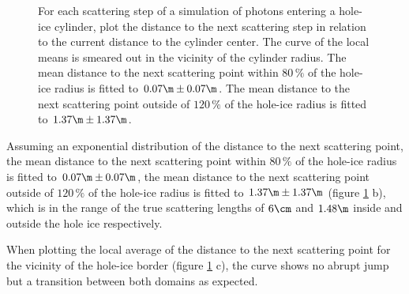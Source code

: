 \begin{figure}[htbp]
  \hfill
  \hfill
  \caption{For each scattering step of a simulation of photons entering a hole-ice cylinder, plot the distance to the next scattering step in relation to the current distance to the cylinder center. The curve of the local means is smeared out in the vicinity of the cylinder radius. The mean distance to the next scattering point within $80\,\%$ of the hole-ice radius is fitted to $0.07\m \pm 0.07\m$. The mean distance to the next scattering point outside of $120\,\%$ of the hole-ice radius is fitted to $1.37\m\pm 1.37\m$. }
  \label{fig:eeYoid2p}
\end{figure}

Assuming an exponential distribution of the distance to the next scattering point, the mean distance to the next scattering point within $80\,\%$ of the hole-ice radius is fitted to $0.07\m \pm 0.07\m$, the mean distance to the next scattering point outside of $120\,\%$ of the hole-ice radius is fitted to $1.37\m\pm 1.37\m$ (figure \ref{fig:eeYoid2p} b), which is in the range of the true scattering lengths of $6\cm$ and $1.48\m$ inside and outside the hole ice respectively.

When plotting the local average of the distance to the next scattering point for the vicinity of the hole-ice border (figure \ref{fig:eeYoid2p} c), the curve shows no abrupt jump but a transition between both domains as expected.

